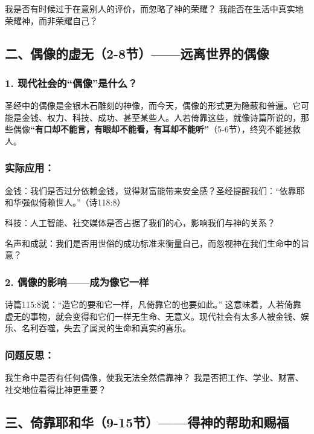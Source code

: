 \documentclass[a4paper, 12pt]{article}
\begin{document}
我是否有时候过于在意别人的评价，而忽略了神的荣耀？
我能否在生活中真实地荣耀神，而非荣耀自己？
\subsection*{二、偶像的虚无（2-8节）——远离世界的偶像}

\subsubsection*{1. 现代社会的“偶像”是什么？}
圣经中的偶像是金银木石雕刻的神像，而今天，偶像的形式更为隐蔽和普遍。它可能是金钱、权力、科技、成功、甚至某些人。人若倚靠这些，就像诗篇所说的，那些偶像\textbf{“有口却不能言，有眼却不能看，有耳却不能听”}（5-6节），终究不能拯救人。

\subsubsection*{实际应用：}

\hspace{0.6cm}金钱：我们是否过分依赖金钱，觉得财富能带来安全感？圣经提醒我们：“依靠耶和华强似倚赖世人。”（诗118:8）

科技：人工智能、社交媒体是否占据了我们的心，影响我们与神的关系？

名声和成就：我们是否用世俗的成功标准来衡量自己，而忽视神在我们生命中的旨意？

\subsubsection*{2. 偶像的影响——成为像它一样}
诗篇115:8说：“造它的要和它一样，凡倚靠它的也要如此。” 这意味着，人若倚靠虚无的事物，就会变得和它们一样无生命、无意义。现代社会有太多人被金钱、娱乐、名利吞噬，失去了属灵的生命和真实的喜乐。

\subsubsection*{问题反思：}

我生命中是否有任何偶像，使我无法全然信靠神？
我是否把工作、学业、财富、社交地位看得比神更重要？
\subsection*{三、倚靠耶和华（9-15节）——得神的帮助和赐福}
\end{document}
